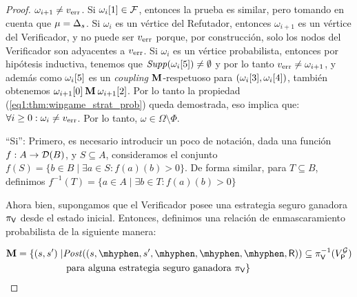 \begin{proof}
$\omega_{i+1} \neq \ErrorSt$. Si $\pr{1}{\omega_i} \in \faults$,
entonces la prueba es similar, pero tomando en cuenta que $\mu = \Dirac_s$.
Si $\omega_i$ es un vértice del Refutador, entonces $\omega_{i+1}$ es un vértice del Verificador, y no puede ser $\ErrorSt$ porque, por construcción, solo los nodos del Verificador son adyacentes a $\ErrorSt$.
Si $\omega_i$ es un vértice probabilista, entonces por hipótesis inductiva, tenemos que $\support{\pr{5}{\omega_i}} \neq \emptyset$ y por lo tanto $\ErrorSt \neq \omega_{i+1}$,
y además como $\pr{5}{\omega_i}$ es un \emph{coupling} $\M$-respetuoso para $(\pr{3}{\omega_i},  \pr{4}{\omega_i})$, también obtenemos  
$ \pr{0}{\omega_{i+1}}  \M \pr{2}{\omega_{i+1}}$. Por lo tanto la propiedad (\ref{eq1:thm:wingame_strat_prob}) queda demostrada,  eso implica que:
$\forall i \geq 0 : \omega_i \neq \ErrorSt$. Por lo tanto, $\omega \in \Omega \setminus \Phi$.

``Si'': Primero, es necesario introducir un poco de notación, dada una función $f: A \rightarrow \Dist(B)$,  y $S \subseteq A$, 
consideramos el conjunto $f(S)= \{ b \in B \mid \exists a \in S: f(a)(b) > 0 \}$.
De forma similar, para $T \subseteq B$, definimos $f^{-1}(T) = \{ a \in A \mid \exists b \in T : f(a)(b) > 0\}$

Ahora bien,  supongamos que el Verificador posee una estrategia seguro ganadora $\strat{\Verifier}$
desde el estado inicial. Entonces, definimos una relación de enmascaramiento probabilista de la siguiente manera: 

\begin{align*}
  \M = \{(s,s') \mid 
  & \post((s, \mhyphen, s', \mhyphen, \mhyphen, \mhyphen, \Refuter)) \subseteq \strat{\Verifier}^{-1}(V^{\StochG}_\Probabilistic) \\
  & \text{ para alguna estrategia seguro ganadora}\ \strat{\Verifier} \}
\end{align*}


\end{proof}
